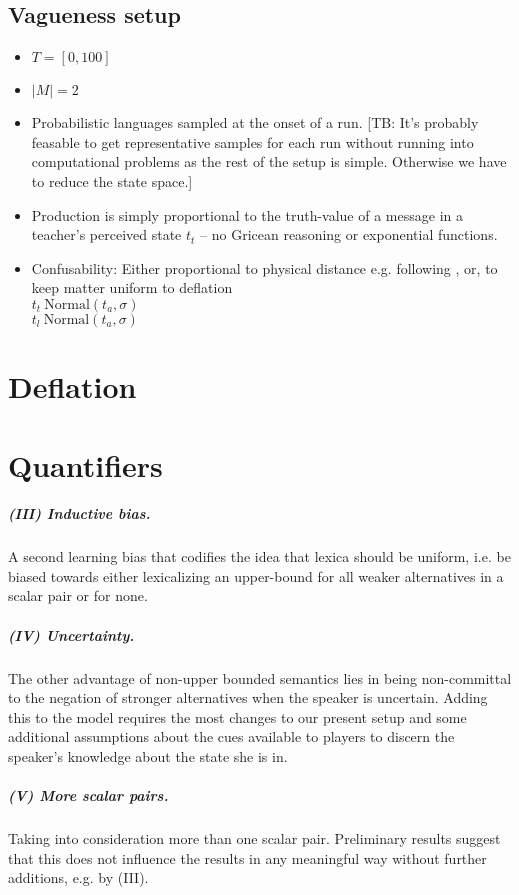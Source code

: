 \documentclass[11pt]{article}
\newcommand{\tb}[1]{\textcolor[rgb]{.8,.33,.0}{[TB: #1]}}%
\begin{document}
\subsection{Vagueness setup}
\begin{itemize}
  \item $T = [0,100]$
  \item $|M| = 2$
  \item Probabilistic languages sampled at the onset of a run. \tb{It's probably feasable to get representative samples for each run without running into computational problems as the rest of the setup is simple. Otherwise we have to reduce the state space.}
  \item Production is simply proportional to the truth-value of a message in a teacher's perceived state $t_t$ -- no Gricean reasoning or exponential functions.
  \item Confusability: Either proportional to physical distance e.g. following \citet[9]{franke+correia}, or, to keep matter uniform to deflation\\
    $t_t ~ \text{Normal}(t_a, \sigma)$\\
    $t_l ~ \text{Normal}(t_a, \sigma)$
\end{itemize}
\section{Deflation}
\section{Quantifiers}

\subparagraph{(III) Inductive bias.} A second learning bias that codifies the idea that lexica should be uniform, i.e. be biased towards either lexicalizing an upper-bound for all weaker alternatives in a scalar pair or for none.

\subparagraph{(IV)  Uncertainty.} The other advantage of non-upper bounded semantics lies in being non-committal to the negation of stronger alternatives when the speaker is uncertain. Adding this to the model requires the most changes to our present setup and some additional assumptions about the cues available to players to discern the speaker's knowledge about the state she is in. 

\subparagraph{(V) More scalar pairs.} Taking into consideration more than one scalar pair. Preliminary results suggest that this does not influence the results in any meaningful way without further additions, e.g. by (III).
\end{document}
